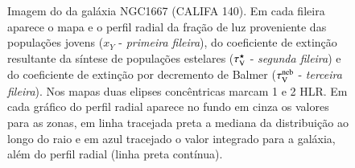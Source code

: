 \begin{figure}
	\centering
	\caption[Imagem e exemplos de mapas e perfis radiais.]
	{Imagem do \SDSS da galáxia NGC1667 (CALIFA 140). Em cada fileira aparece o mapa e o perfil radial
da fração de luz proveniente das populações jovens ($x_Y$ - \emph{primeira fileira}), do
coeficiente de extinção resultante da síntese de populações estelares ($\tau_{\mathrm{V}}^\star$ - \emph{segunda
fileira}) e do coeficiente de extinção por decremento de Balmer ($\tau_{\mathrm{V}}^{\mathrm{neb}}$ - \emph{terceira
fileira}). Nos mapas duas elipses concêntricas marcam 1 e 2 HLR. Em cada gráfico do perfil radial
aparece no fundo em cinza os valores para as zonas, em linha tracejada preta a mediana da
distribuição ao longo do raio e em azul tracejado o valor integrado para a galáxia, além do perfil
radial (linha preta contínua).}
	\label{fig:K0140xYRadProf}
\end{figure}
 
